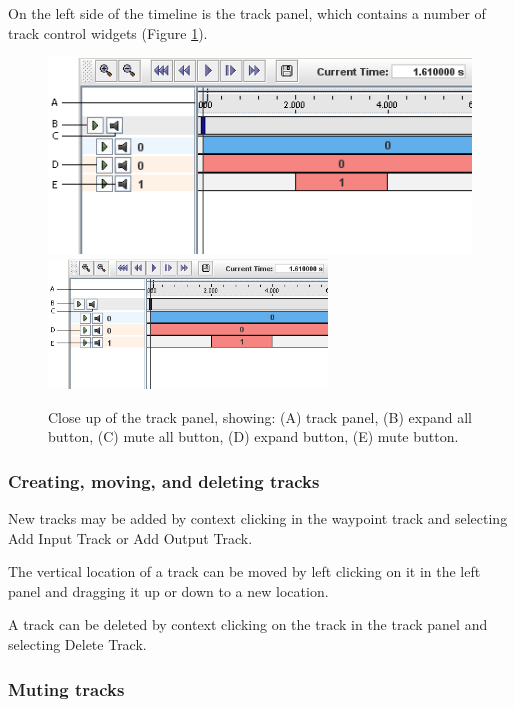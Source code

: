 \documentclass{article}
\begin{document}
On the left side of the timeline is the track panel, which
contains a number of track control widgets (Figure \ref{trackPanelFig}).

\begin{figure}
\begin{center}
\iflatexml
\includegraphics[]{images/trackPanel}
\else
\includegraphics[width=0.66\textwidth]{images/trackPanel}
\fi
\end{center}
\caption{Close up of the track panel, showing: (A) track panel, (B)
expand all button, (C) mute all button, (D) expand button, (E) mute
button.}%
\label{trackPanelFig}
\end{figure}

\subsubsection{Creating, moving, and deleting tracks}

New tracks may be added by context clicking in the waypoint track and
selecting {\sf Add Input Track} or {\sf Add Output Track}. 

The vertical location of a track can be moved by left clicking on it
in the left panel and dragging it up or down to a new location.

A track can be deleted by context clicking on the track in
the track panel and selecting {\sf Delete Track}.

\subsubsection{Muting tracks}
\end{document}
